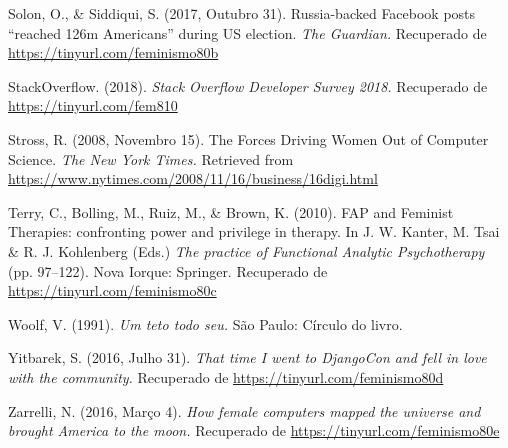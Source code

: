 \hangindent=25pt
\noindent Solon, O., \& Siddiqui, S. (2017, Outubro 31). Russia-backed Facebook posts “reached 126m Americans” during US election. \textit{The Guardian.} Recuperado de \url{https://tinyurl.com/feminismo80b}

\hangindent=25pt
\noindent StackOverflow. (2018). \textit{Stack Overflow Developer Survey 2018.} Recuperado de \url{https://tinyurl.com/fem810}

\hangindent=25pt
\noindent Stross, R. (2008, Novembro 15). The Forces Driving Women Out of Computer Science. \textit{The New York Times.} Retrieved from \url{https://www.nytimes.com/2008/11/16/business/16digi.html}

\hangindent=25pt
\noindent Terry, C., Bolling, M., Ruiz, M., \& Brown, K. (2010). FAP and Feminist Therapies: confronting power and privilege in therapy. In J. W. Kanter, M. Tsai \& R. J. Kohlenberg (Eds.) \textit{The practice of Functional Analytic Psychotherapy} (pp. 97–122). Nova Iorque: Springer. Recuperado de \url{https://tinyurl.com/feminismo80c}

\hangindent=25pt
\noindent Woolf, V. (1991). \textit{Um teto todo seu.} São Paulo: Círculo do livro.

\hangindent=25pt
\noindent Yitbarek, S. (2016, Julho 31). \textit{That time I went to DjangoCon and fell in love with the community.} Recuperado de \url{https://tinyurl.com/feminismo80d}

\hangindent=25pt
\noindent Zarrelli, N. (2016, Março 4). \textit{How female computers mapped the universe and brought America to the moon.} Recuperado de \url{https://tinyurl.com/feminismo80e}

